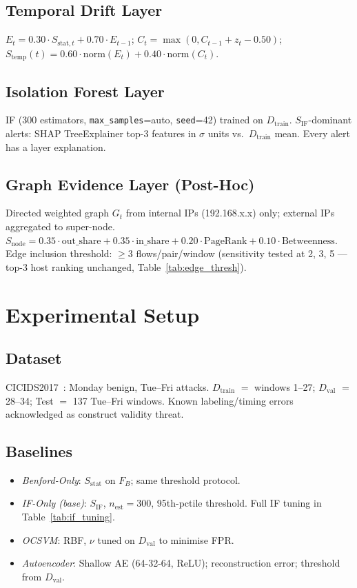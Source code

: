 \documentclass[journal,10pt,twoside]{IEEEtran}
\newcommand{\sstat}{$S_{\mathrm{stat}}$}
\newcommand{\sif}{$S_{\mathrm{IF}}$}
\newcommand{\dtrain}{$D_{\mathrm{train}}$}
\newcommand{\dval}{$D_{\mathrm{val}}$}
\begin{document}
\subsection{Temporal Drift Layer}
$E_t = 0.30{\cdot}S_{\mathrm{stat},t}+0.70{\cdot}E_{t-1}$;
$C_t = \max(0,C_{t-1}+z_t-0.50)$;
$S_{\mathrm{temp}}(t) = 0.60{\cdot}\mathrm{norm}(E_t)
  +0.40{\cdot}\mathrm{norm}(C_t)$.

\subsection{Isolation Forest Layer}
IF (300 estimators, \texttt{max\_samples}=auto, \texttt{seed}=42)
trained on \dtrain{}.  \sif{}-dominant alerts: SHAP TreeExplainer
top-3 features in $\sigma$ units vs.\ \dtrain{} mean.  Every alert
has a layer explanation.

\subsection{Graph Evidence Layer (Post-Hoc)}
Directed weighted graph $G_t$ from internal IPs (192.168.x.x) only;
external IPs aggregated to super-node.
$S_{\mathrm{node}} = 0.35{\cdot}\text{out\_share}
  +0.35{\cdot}\text{in\_share}+0.20{\cdot}\text{PageRank}
  +0.10{\cdot}\text{Betweenness}$.
Edge inclusion threshold: $\ge3$ flows/pair/window (sensitivity
tested at 2, 3, 5 --- top-3 host ranking unchanged,
Table~\ref{tab:edge_thresh}).

\section{Experimental Setup}
\label{sec:setup}

\subsection{Dataset}
CICIDS2017~\cite{sharafaldin2017cicids}: Monday benign, Tue--Fri
attacks.  \dtrain{} $=$ windows 1--27; \dval{} $=$ 28--34;
Test $=$ 137 Tue--Fri windows.  Known labeling/timing
errors~\cite{lanvin2024errors} acknowledged as construct validity
threat.

\subsection{Baselines}
\begin{itemize}
  \item[\textbf{B1}] \textit{Benford-Only}: \sstat{} on $F_B$;
    same threshold protocol.
  \item[\textbf{B2}] \textit{IF-Only (base)}: \sif{},
    $n_{\mathrm{est}}{=}300$, 95th-pctile threshold.
    Full IF tuning in Table~\ref{tab:if_tuning}.
  \item[\textbf{B3}] \textit{OCSVM}: RBF, $\nu$ tuned on \dval{}
    to minimise FPR.
  \item[\textbf{B4}] \textit{Autoencoder}: Shallow AE
    (64-32-64, ReLU); reconstruction error; threshold from \dval{}.
\end{itemize}
\end{document}
